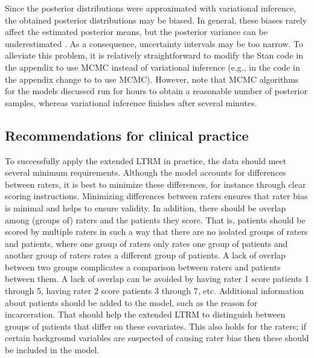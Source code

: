 \documentclass[a4paper,usenames,dvipsnames]{article}
\newcommand{\DON}	[1] 	{}%
\newcommand{\MR}	[1] 	{}%
\begin{document}
Since the posterior distributions were approximated with variational inference, the obtained posterior distributions may be biased. In general, these biases rarely affect the estimated posterior means, but the posterior variance can be underestimated \cite{blei2017variational}. As a consequence, uncertainty intervals may be too narrow. To alleviate this problem, it is relatively straightforward to modify the Stan code in the appendix to use MCMC instead of variational inference (e.g., in the code in the appendix change  to  to use MCMC). However, note that MCMC algorithms for the models discussed run for hours to obtain a reasonable number of posterior samples, whereas variational inference finishes after several minutes.

\subsection*{Recommendations for clinical practice}
To successfully apply the extended LTRM in practice, the data should meet several minimum requirements. Although the model accounts for differences between raters, it is best to minimize these differences, for instance through clear scoring instructions.\MR{why?}\DON{see 2nd sentence} Minimizing differences between raters ensures that rater bias is minimal and helps to ensure validity. In addition, there should be overlap among (groups of) raters and the patients they score. That is, patients should be scored by multiple raters in such a way that there are no isolated groups of raters and patients, where one group of raters only rates one group of patients and another group of raters rates a different group of patients. A lack of overlap between two groups complicates a comparison between raters and patients between them. A lack of overlap can be avoided by having rater 1 score patients 1 through 5, having rater 2 score patients 3 through 7, etc. Additional information about patients should be added to the model, such as the reason for incarceration. That should help the extended LTRM to distinguish between groups of patients that differ on these covariates. This also holds for the raters; if certain background variables are suspected of causing rater bias then these should be included in the model.\MR{ok, I get this part. I'm still very unclear on what the patient background info adds if the goal is to produce factor scores, and not to estimate the effect of patient characteristics on those scores, what is added by including them?}%
\end{document}
